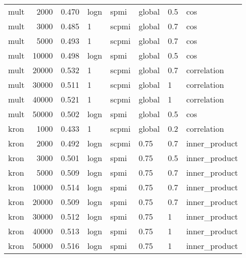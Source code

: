 \begin{tabular}{lrrlllll}
    mult &            2000 &  0.470 &  logn &   spmi &  global &  0.5 &            cos \\
    mult &            3000 &  0.485 &     1 &  scpmi &  global &  0.7 &            cos \\
    mult &            5000 &  0.493 &     1 &  scpmi &  global &  0.7 &            cos \\
    mult &           10000 &  0.498 &  logn &   spmi &  global &  0.5 &            cos \\
    mult &           20000 &  0.532 &     1 &  scpmi &  global &  0.7 &    correlation \\
    mult &           30000 &  0.511 &     1 &  scpmi &  global &    1 &    correlation \\
    mult &           40000 &  0.521 &     1 &  scpmi &  global &    1 &    correlation \\
    mult &           50000 &  0.502 &  logn &   spmi &  global &  0.5 &            cos \\
    kron &            1000 &  0.433 &     1 &  scpmi &  global &  0.2 &    correlation \\
    kron &            2000 &  0.492 &  logn &  scpmi &    0.75 &  0.7 &  inner\_product \\
    kron &            3000 &  0.501 &  logn &   spmi &    0.75 &  0.5 &  inner\_product \\
    kron &            5000 &  0.509 &  logn &   spmi &    0.75 &  0.7 &  inner\_product \\
    kron &           10000 &  0.514 &  logn &   spmi &    0.75 &  0.7 &  inner\_product \\
    kron &           20000 &  0.509 &  logn &   spmi &    0.75 &  0.7 &  inner\_product \\
    kron &           30000 &  0.512 &  logn &   spmi &    0.75 &    1 &  inner\_product \\
    kron &           40000 &  0.513 &  logn &   spmi &    0.75 &    1 &  inner\_product \\
    kron &           50000 &  0.516 &  logn &   spmi &    0.75 &    1 &  inner\_product \\
\bottomrule
\end{tabular}
